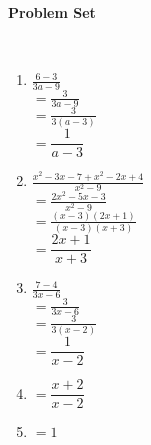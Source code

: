 \textbf{Problem Set}

\ 


\begin{enumerate}[label = \arabic*. ]

\item \hspce%
$\displaystyle \frac{6-3}{3a-9}$\\
$=\displaystyle \frac{3}{3a-9}$\\
$=\displaystyle \frac{3}{3(a-3)}$\\
$=\dfrac{1}{a - 3} $
\item \hspce%
$\displaystyle \frac{x^{2}-3x-7+x^{2}-2x+4}{x^{2}-9}$\\
$=\displaystyle \frac{2 x^{2} - 5 x - 3}{x^{2}-9}$\\
$=\displaystyle \frac{\left(x - 3\right) \left(2 x + 1\right)}{\left(x - 3\right) \left(x + 3\right)}$\\
$=\dfrac{2 x + 1}{x + 3}$

\item \hspce%
$\displaystyle \frac{7-4}{3x-6}$\\
$=\displaystyle \frac{3}{3x-6}$\\
$=\displaystyle \frac{3}{3(x-2)}$\\
$=\dfrac{1}{x - 2}$
\item \hspce%

$=\dfrac{x + 2}{x - 2}$
\item \hspce%

$=1$
\end{enumerate}
